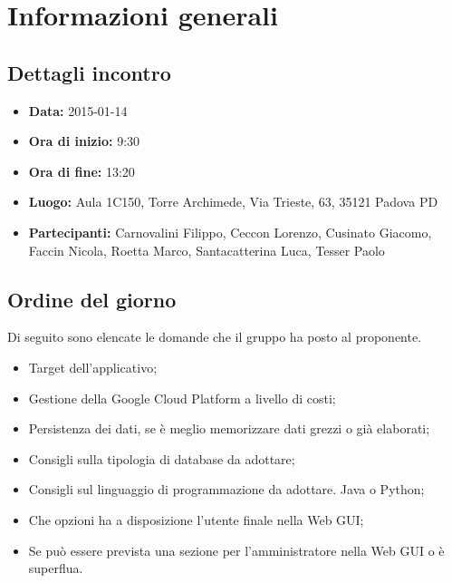 %


\section{Informazioni generali} %
\label{sec:informazioni_generali}
	\subsection{Dettagli incontro} %
	\label{sub:dettagli_incontro}
		\begin{itemize}
			\item \textbf{Data:} 2015-01-14
			\item \textbf{Ora di inizio:} 9:30
			\item \textbf{Ora di fine:} 13:20
			\item \textbf{Luogo:} Aula 1C150, Torre Archimede, Via Trieste, 63, 35121 Padova PD
			\item \textbf{Partecipanti:} Carnovalini Filippo, Ceccon Lorenzo, Cusinato Giacomo, Faccin Nicola, Roetta Marco, Santacatterina Luca, Tesser Paolo
		\end{itemize}
	
	\subsection{Ordine del giorno} %
	\label{sub:ordine_del_giorno}
	Di seguito sono elencate le domande che il gruppo ha posto al proponente\gloss{}.
		\begin{itemize}
			\item Target dell'applicativo;
			\item Gestione della Google Cloud Platform a livello di costi;
			\item Persistenza dei dati, se è meglio memorizzare dati grezzi o già elaborati;
			\item Consigli sulla tipologia di database\gloss{} da adottare;
			\item Consigli sul linguaggio di programmazione da adottare. Java\gloss{} o Python;
			\item Che opzioni ha a disposizione l'utente finale nella Web GUI;
			\item Se può essere prevista una sezione per l'amministratore nella Web GUI o è superflua.
		\end{itemize}
